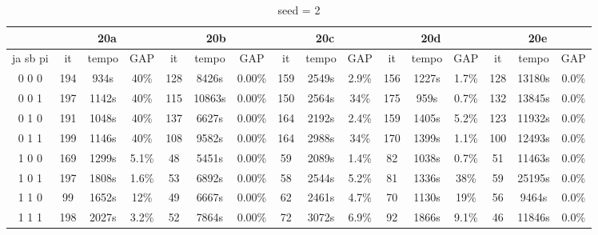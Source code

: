 \documentclass[12pt]{article}
\begin{document}
\begin{table}[!htb]
\centering
\footnotesize
\begin{tabular}{|c||c|c|c||c|c|c||c|c|c||c|c|c||c|c|c|}
\cline{2-16}
\multicolumn{1}{c||}{} & \multicolumn{3}{c||}{20a} & \multicolumn{3}{c||}{20b} & \multicolumn{3}{c||}{20c} & \multicolumn{3}{c||}{20d} & \multicolumn{3}{c|}{20e}\\
\hline
ja sb pi & it & tempo & GAP & it & tempo & GAP & it & tempo & GAP & it & tempo & GAP & it & tempo & GAP \\
\hline
0 0 0 & 194 & 934s & 40\% & 128 & 8426s & 0.00\% & 159 & 2549s & 2.9\% & 156 & 1227s & 1.7\% & 128 & 13180s & 0.0\% \\
0 0 1 & 197 & 1142s & 40\% & 115 & 10863s & 0.00\% & 150 & 2564s & 34\% & 175 & 959s & 0.7\% & 132 & 13845s & 0.0\% \\
0 1 0 & 191 & 1048s & 40\% & 137 & 6627s & 0.00\% & 164 & 2192s & 2.4\% & 159 & 1405s & 5.2\% & 123 & 11932s & 0.0\% \\
0 1 1 & 199 & 1146s & 40\% & 108 & 9582s & 0.00\% & 164 & 2988s & 34\% & 170 & 1399s & 1.1\% & 100 & 12493s & 0.0\% \\
1 0 0 & 169 & 1299s & 5.1\% & 48 & 5451s & 0.00\% & 59 & 2089s & 1.4\% & 82 & 1038s & 0.7\% & 51 & 11463s & 0.0\% \\
1 0 1 & 197 & 1808s & 1.6\% & 53 & 6892s & 0.00\% & 58 & 2544s & 5.2\% & 81 & 1336s & 38\% & 59 & 25195s & 0.0\% \\
1 1 0 & 99 & 1652s & 12\% & 49 & 6667s & 0.00\% & 62 & 2461s & 4.7\% & 70 & 1130s & 19\% & 56 & 9464s & 0.0\% \\
1 1 1 & 198 & 2027s & 3.2\% & 52 & 7864s & 0.00\% & 72 & 3072s & 6.9\% & 92 & 1866s & 9.1\% & 46 & 11846s & 0.0\% \\
\hline
\end{tabular}
\caption{seed = 2}
\end{table}
\end{document}
